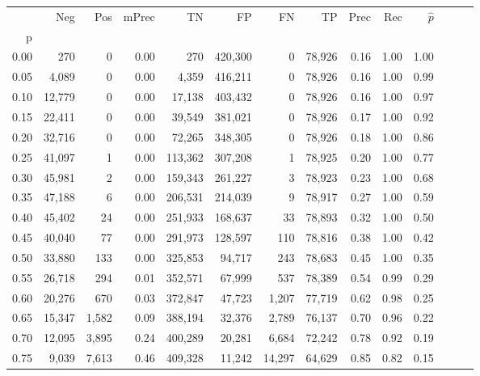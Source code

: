 \begin{tabular}{rrrrrrrrrrrrrr}
\toprule
{} &     Neg &     Pos & mPrec &       TN &       FP &      FN &      TP &  Prec &   Rec & $\hat{p}$ \\
p    &         &         &       &          &          &         &         &       &       &           \\
\midrule
0.00 &     270 &       0 &  0.00 &      270 &  420,300 &       0 &  78,926 &  0.16 &  1.00 &      1.00 \\
0.05 &   4,089 &       0 &  0.00 &    4,359 &  416,211 &       0 &  78,926 &  0.16 &  1.00 &      0.99 \\
0.10 &  12,779 &       0 &  0.00 &   17,138 &  403,432 &       0 &  78,926 &  0.16 &  1.00 &      0.97 \\
0.15 &  22,411 &       0 &  0.00 &   39,549 &  381,021 &       0 &  78,926 &  0.17 &  1.00 &      0.92 \\
0.20 &  32,716 &       0 &  0.00 &   72,265 &  348,305 &       0 &  78,926 &  0.18 &  1.00 &      0.86 \\
0.25 &  41,097 &       1 &  0.00 &  113,362 &  307,208 &       1 &  78,925 &  0.20 &  1.00 &      0.77 \\
0.30 &  45,981 &       2 &  0.00 &  159,343 &  261,227 &       3 &  78,923 &  0.23 &  1.00 &      0.68 \\
0.35 &  47,188 &       6 &  0.00 &  206,531 &  214,039 &       9 &  78,917 &  0.27 &  1.00 &      0.59 \\
0.40 &  45,402 &      24 &  0.00 &  251,933 &  168,637 &      33 &  78,893 &  0.32 &  1.00 &      0.50 \\
0.45 &  40,040 &      77 &  0.00 &  291,973 &  128,597 &     110 &  78,816 &  0.38 &  1.00 &      0.42 \\
0.50 &  33,880 &     133 &  0.00 &  325,853 &   94,717 &     243 &  78,683 &  0.45 &  1.00 &      0.35 \\
0.55 &  26,718 &     294 &  0.01 &  352,571 &   67,999 &     537 &  78,389 &  0.54 &  0.99 &      0.29 \\
0.60 &  20,276 &     670 &  0.03 &  372,847 &   47,723 &   1,207 &  77,719 &  0.62 &  0.98 &      0.25 \\
0.65 &  15,347 &   1,582 &  0.09 &  388,194 &   32,376 &   2,789 &  76,137 &  0.70 &  0.96 &      0.22 \\
0.70 &  12,095 &   3,895 &  0.24 &  400,289 &   20,281 &   6,684 &  72,242 &  0.78 &  0.92 &      0.19 \\
0.75 &   9,039 &   7,613 &  0.46 &  409,328 &   11,242 &  14,297 &  64,629 &  0.85 &  0.82 &      0.15 \\

\end{tabular}
